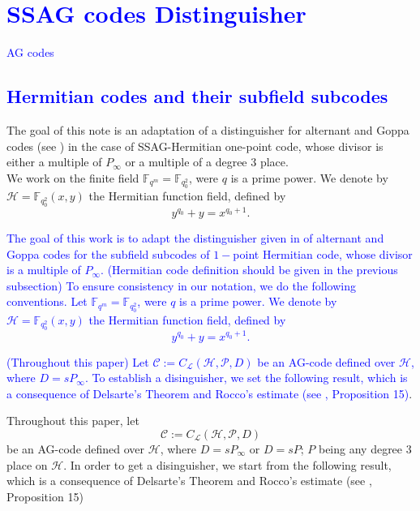 \documentclass[a4paper]{article}
\newcommand{\calH}{\mathcal{H}}
\newcommand{\calL}{\mathcal{L}}
\begin{document}
\section{\textcolor{blue}{SSAG codes Distinguisher}}
\textcolor{blue}{AG codes}
\subsection{\textcolor{blue}{Hermitian codes and their subfield subcodes}}

The goal of this note is an adaptation of a distinguisher for alternant and Goppa codes (see \cite{rocco}) in the case of SSAG-Hermitian one-point code, whose divisor is either a multiple of $P_{\infty}$ or a multiple of a degree 3 place. \\
We work on the finite field $\mathbb{F}_{q^m}=\mathbb{F}_{q_0^2}$, were $q$ is a prime power. We denote by $\calH = \mathbb{F}_{q_0^2}(x,y)$ the Hermitian function field, defined by 
\[ y^{q_0}+y=x^{q_0+1}.\]

\textcolor{blue}{The goal of this work is to adapt the distinguisher given in \cite{rocco} of alternant and Goppa codes for the subfield subcodes of $1-$point Hermitian code, whose divisor is a multiple of $P_{\infty}$. (Hermitian code definition should be given in the previous subsection) To ensure consistency in our notation, we do the following conventions. Let $\mathbb{F}_{q^m}=\mathbb{F}_{q_0^2}$, were $q$ is a prime power. We denote by $\calH = \mathbb{F}_{q_0^2}(x,y)$ the Hermitian function field, defined by 
	\[ y^{q_0}+y=x^{q_0+1}.\] }

\textcolor{blue}{(Throughout this paper) Let $\mathcal{C} := C_{\calL}(\calH,\mathcal{P},D)$ be an AG-code defined over $\calH$, where $D=sP_{\infty}$. To establish a disinguisher, we set the following result, which is a consequence of Delsarte's Theorem and Rocco's estimate (see \cite{rocco}, Proposition 15)}.


Throughout this paper, let
\[\mathcal{C} := C_{\calL}(\calH,\mathcal{P},D) \]
be an AG-code defined over $\calH$, where $D=sP_{\infty}$ or $D=sP$; $P$ being any degree 3 place on $\calH$. 
In order to get a disinguisher, we start from the following result, which is a consequence of Delsarte's Theorem and Rocco's estimate (see \cite{rocco}, Proposition 15)
\end{document}
